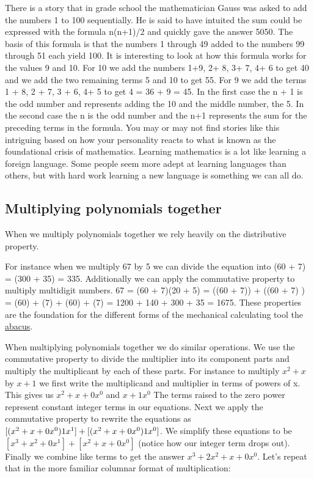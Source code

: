 There is a story that in grade school the mathematician Gauss was asked to add the numbers
1 to 100 sequentially. He is said to have intuited the sum could be expressed with the
formula n(n+1)/2 and quickly gave the answer 5050. The basis of this formula is that the
numbers 1 through 49 added to the numbers 99 through 51 each yield 100. It is interesting
to look at how this formula works for the values 9 and 10. For 10 we add the numbers 1+9,
2+ 8, 3+ 7, 4+ 6 to get 40 and we add the two remaining terms 5 and 10 to get 55. For 9 we
add the terms 1 + 8, 2 + 7, 3 + 6, 4+ 5 to get 4 = 36 + 9 = 45. In the first case the n
+ 1 is the odd number and represents adding the 10 and the middle number, the 5. In the
second case the n is the odd number and the n+1 represents the sum for the preceding terms
in the formula. You may or may not find stories like this intriguing based on how your
personality reacts to what is known as the foundational crisis of mathematics. Learning
mathematics is a lot like learning a foreign language. Some people seem more adept at
learning languages than others, but with hard work learning a new language is something we
can all do.




\subsection{Multiplying polynomials together}
\label{sss:mult-3dfe}




When we multiply polynomials together we rely heavily on the distributive property.



For instance when we multiply 67 by 5 we can divide the equation into (60 + 7) = (300 +
35) = 335. Additionally we can apply the commutative property to multiply multidigit
numbers. 67 = (60 + 7)(20 + 5) = ((60 + 7)) + ((60 + 7) ) = (60) + (7)
+ (60) + (7) = 1200 + 140 + 300 + 35 = 1675. These properties are the foundation for
the different forms of the mechanical calculating tool the \href{w:abacus
"wikilink"}{abacus}.



When multiplying polynomials together we do similar operations. We use the commutative
property to divide the multiplier into its component parts and multiply the multiplicant
by each of these parts. For instance to multiply $x^2 + x$ by $x  + 1$ we first write the
multiplicand and multiplier in terms of powers of x. This gives us $x^2 + x + 0x^0$ and $x
+ 1x^0$ The terms raised to the zero power represent constant integer terms in our
equations. Next we apply the commutative property to rewrite the equations as $[(x^2 + x +
0x^0)\*1x^1] + [(x^2 + x + 0x^0)\*1x^0]$. We simplify these equations to be $[x^3 + x^2 +
0x^1] + [x^2 + x + 0x^0]$ (notice how our integer term drops out). Finally we combine like
terms to get the answer $x^3 + 2x^2 + x +0x^0$. Let's repeat that in the more familiar
columnar format of multiplication:



